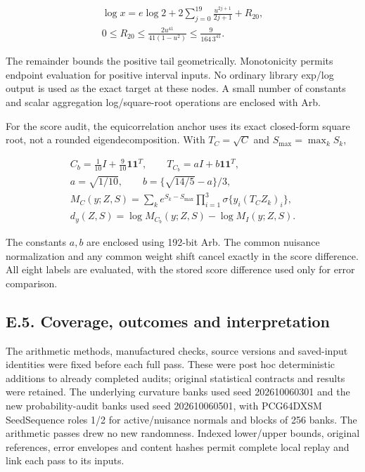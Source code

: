 \documentclass{article}
\begin{document}
\[
\begin{gathered}
\log x=e\log2+2\sum_{j=0}^{19}\frac{u^{2j+1}}{2j+1}+R_{20},\\
0\le R_{20}\le\frac{2u^{41}}{41(1-u^2)}
\le\frac9{164\,3^{41}}.
\end{gathered}
\tag{E.7}
\]

The remainder bounds the positive tail geometrically. Monotonicity
permits endpoint evaluation for positive interval inputs. No ordinary
library exp/log output is used as the exact target at these nodes. A
small number of constants and scalar aggregation log/square-root
operations are enclosed with Arb.

For the score audit, the equicorrelation anchor uses its exact
closed-form square root, not a rounded eigendecomposition. With
\(T_C=\sqrt C\) and \(S_{\max}=\max_kS_k\),

\[
\begin{gathered}
C_b=\tfrac1{10}I+\tfrac9{10}\mathbf1\mathbf1^T,\qquad
T_{C_b}=aI+b\mathbf1\mathbf1^T,\\
a=\sqrt{1/10},\qquad b=\{\sqrt{14/5}-a\}/3,\\
M_C(y;Z,S)=\sum_ke^{S_k-S_{\max}}\prod_{i=1}^3\sigma\{y_i(T_CZ_k)_i\},\\
d_y(Z,S)=\log M_{C_b}(y;Z,S)-\log M_I(y;Z,S).
\end{gathered}
\tag{E.8}
\]

The constants \(a,b\) are enclosed using 192-bit Arb. The common
nuisance normalization and any common weight shift cancel exactly in the
score difference. All eight labels are evaluated, with the stored score
difference used only for error comparison.

\subsection*{E.5. Coverage, outcomes and
interpretation}\label{e.5.-coverage-outcomes-and-interpretation}

The arithmetic methods, manufactured checks, source versions and
saved-input identities were fixed before each full pass. These were post
hoc deterministic additions to already completed audits; original
statistical contracts and results were retained. The underlying
curvature banks used seed 202610060301 and the new probability-audit
banks used seed 202610060501, with PCG64DXSM SeedSequence roles 1/2 for
active/nuisance normals and blocks of 256 banks. The arithmetic passes
drew no new randomness. Indexed lower/upper bounds, original references,
error envelopes and content hashes permit complete local replay and link
each pass to its inputs.
\end{document}
